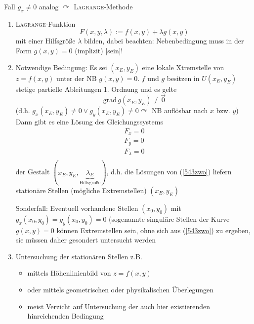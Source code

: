 \documentclass[a4paper]{scrartcl}
\begin{document}
\begin{enumerate}
Fall $g_x \neq 0$ analog $\curvearrowright$ \textsc{Lagrange}-Methode
\begin{enumerate}
\item \textsc{Lagrange}-Funktion
\[ F(x,y,\lambda) := f(x,y) + \lambda g(x,y)\]
mit einer Hilfsgröße $\lambda$ bilden, dabei beachten: Nebenbedingung muss in der Form $g(x,y) = 0$ (implizit) [sein]!
\item Notwendige Bedingung: Es sei $(x_E,y_E)$ eine lokale Xtremstelle von $z=f(x,y)$ unter der NB $g(x,y) = 0$. $f$ und $g$ besitzen in $U(x_E,y_E)$ stetige partielle Ableitungen 1. Ordnung und es gelte\begin{equation}\label{543eins}\text{grad}\, g(x_E,y_E) \neq \vec{0}\end{equation} (d.h. $g_x(x_E,y_E) \neq 0 \vee g_y(x_E,y_E) \neq 0 \curvearrowright$ NB auflösbar nach $x$ bzw. $y$)\\
Dann gibt es eine Lösung des Gleichungssystems \begin{equation}\label{543zwo}\begin{array}{c} F_x = 0 \\ F_y = 0\\ F_\lambda = 0\\ \end{array}\end{equation} der Gestalt $(x_E,y_E,\underbrace{\lambda_E}_{\text{Hilfsgröße}})$, d.h. die Lösungen von (\ref{543zwo}) liefern stationäre Stellen (mögliche Extremstellen) $(x_E,y_E)$

Sonderfall: Eventuell vorhandene Stellen $(x_0,y_0)$ mit $g_x(x_0,y_0) = g_y(x_0,y_0) = 0$ (sogenannte singuläre Stellen der Kurve $g(x,y) = 0$ können Extremstellen sein, ohne sich aus (\ref{543zwo}) zu ergeben, sie müssen daher gesondert untersucht werden
\item Untersuchung der stationären Stellen z.B.
\begin{itemize}
\item mittels Höhenlinienbild von $z=f(x,y)$
\item oder mittels geometrischen oder physikalischen Überlegungen
\item meist Verzicht auf Untersuchung der auch hier existierenden hinreichenden Bedingung
\end{itemize}
\end{enumerate}


\end{enumerate}
\end{document}
